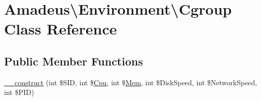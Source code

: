\hypertarget{classAmadeus_1_1Environment_1_1Cgroup}{}\section{Amadeus\textbackslash{}Environment\textbackslash{}Cgroup Class Reference}
\label{classAmadeus_1_1Environment_1_1Cgroup}
\subsection*{Public Member Functions}
\begin{DoxyCompactItemize}
\item 
\hyperlink{classAmadeus_1_1Environment_1_1Cgroup_a9aaf52f72903608983ad31754aabdc01}{\+\_\+\+\_\+construct} (int \$S\+ID, int \$\hyperlink{classAmadeus_1_1Environment_1_1Cgroup_1_1Cpu}{Cpu}, int \$\hyperlink{classAmadeus_1_1Environment_1_1Cgroup_1_1Mem}{Mem}, int \$Disk\+Speed, int \$Network\+Speed, int \$P\+ID)
\end{DoxyCompactItemize}
